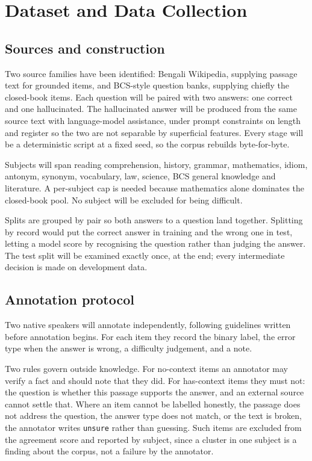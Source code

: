 \documentclass[12pt,a4paper]{article}
\begin{document}
\section{Dataset and Data Collection}

\subsection{Sources and construction}

Two source families have been identified: Bengali Wikipedia,
supplying passage text for grounded items, and BCS-style question
banks, supplying chiefly the closed-book items. Each question will be paired with two answers: one correct and one hallucinated.
The hallucinated answer will be produced from the same source text with
language-model assistance, under prompt constraints on length and register so
the two are not separable by superficial features. Every stage will be a
deterministic script at a fixed seed, so the corpus rebuilds byte-for-byte.


Subjects will span reading comprehension, history, grammar, mathematics, idiom,
antonym, synonym, vocabulary, law, science, BCS general knowledge and
literature. A per-subject cap is needed because mathematics alone dominates the
closed-book pool. No subject will be excluded for being difficult.

Splits are grouped by pair so both answers to a question land together.
Splitting by record would put the correct answer in training and the wrong one
in test, letting a model score by recognising the question rather than judging
the answer. The test split will be examined exactly once, at the end; every
intermediate decision is made on development data.

\subsection{Annotation protocol}

Two native speakers will annotate independently, following guidelines written
before annotation begins. For each item they record the binary label, the
error type when the answer is wrong, a difficulty judgement, and a note.

Two rules govern outside knowledge. For no-context items an annotator
may verify a fact and should note that they did. For has-context items they must
not: the question is whether this passage supports the answer, and an
external source cannot settle that. Where an item cannot be labelled honestly,
the passage does not address the question, the answer type does not match, or
the text is broken, the annotator writes \texttt{unsure} rather than guessing.
Such items are excluded from the agreement score and reported by subject, since
a cluster in one subject is a finding about the corpus, not a failure by the
annotator.
\end{document}
